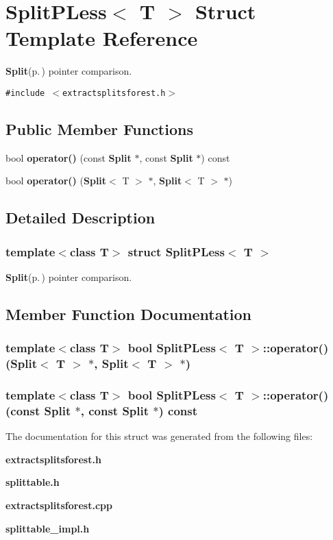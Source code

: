 \section{Split\-PLess$<$ T $>$ Struct Template Reference}
\label{structSplitPLess}
{\bf Split}{\rm (p.\,\pageref{classSplit})} pointer comparison.  


{\tt \#include $<$extractsplitsforest.h$>$}

\subsection*{Public Member Functions}
\begin{CompactItemize}
\item 
bool {\bf operator()} (const {\bf Split} $\ast$, const {\bf Split} $\ast$) const 
\item 
bool {\bf operator()} ({\bf Split}$<$ T $>$ $\ast$, {\bf Split}$<$ T $>$ $\ast$)
\end{CompactItemize}


\subsection{Detailed Description}
\subsubsection*{template$<$class T$>$ struct Split\-PLess$<$ T $>$}

{\bf Split}{\rm (p.\,\pageref{classSplit})} pointer comparison. 



\subsection{Member Function Documentation}
\subsubsection{\setlength{\rightskip}{0pt plus 5cm}template$<$class T$>$ bool {\bf Split\-PLess}$<$ T $>$::operator() ({\bf Split}$<$ T $>$ $\ast$, {\bf Split}$<$ T $>$ $\ast$)}\label{structSplitPLess_a1}


\subsubsection{\setlength{\rightskip}{0pt plus 5cm}template$<$class T$>$ bool {\bf Split\-PLess}$<$ T $>$::operator() (const {\bf Split} $\ast$, const {\bf Split} $\ast$) const}\label{structSplitPLess_a0}




The documentation for this struct was generated from the following files:\begin{CompactItemize}
\item 
{\bf extractsplitsforest.h}\item 
{\bf splittable.h}\item 
{\bf extractsplitsforest.cpp}\item 
{\bf splittable\_\-impl.h}\end{CompactItemize}

